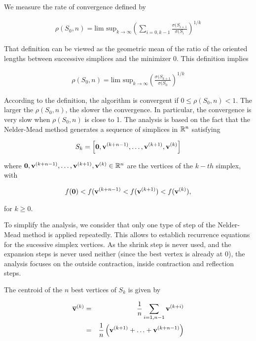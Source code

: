 We measure the rate of convergence defined by \cite{HanNeumann2006}

\begin{eqnarray}
\label{rho-rate-convergence}
\rho(S_0,n) = \textrm{lim sup}_{k\rightarrow \infty} 
\left(\sum_{i=0,k-1} \frac{\sigma(S_{i+1}}{\sigma(S_i}\right)^{1/k}
\end{eqnarray}

That definition can be viewed as the geometric mean of the ratio of the 
oriented lengths between successive simplices and the minimizer 0.
This definition implies 

\begin{eqnarray}
\label{rho-rate-convergence2}
\rho(S_0,n) = \textrm{lim sup}_{k\rightarrow \infty} 
\left( \frac{\sigma(S_{k+1}}{\sigma(S_0}\right)^{1/k}
\end{eqnarray}

According to the definition, the algorithm is convergent if $0\leq \rho(S_0,n) < 1$.
The larger the $\rho(S_0,n)$, the slower the convergence. In particular, the convergence 
is very slow when $\rho(S_0,n)$ is close to 1. 
The analysis is based on the fact that the Nelder-Mead method generates a sequence of simplices
in $\mathbb{R}^n$ satisfying 

\begin{eqnarray}
S_k = \left[\bold{0},\mathbf{v}^{(k+n-1)},\ldots,\mathbf{v}^{(k+1)},\mathbf{v}^{(k)}\right]
\end{eqnarray}

where $\bold{0},\mathbf{v}^{(k+n-1)},\ldots,\mathbf{v}^{(k+1)},\mathbf{v}^{(k)}\in\mathbb{R}^n$ are the vertices
of the $k-th$ simplex, with

\begin{eqnarray}
f(\bold{0}) < f(\mathbf{v}^{(k+n-1)} < f(\mathbf{v}^{(k+1)}) < f(\mathbf{v}^{(k)}),
\end{eqnarray}

for $k\geq 0$. 

To simplify the analysis, we consider that only one type of step of the Nelder-Mead 
method is applied repeatedly. This allows to establich recurrence equations for the 
sucessive simplex vertices. As the shrink step is never used, and the expansion steps is 
never used neither (since the best vertex is already at 0), the analysis focuses
on the outside contraction, inside contraction and reflection steps.

The centroid of the $n$ best vertices of $S_k$ is given by 

\begin{eqnarray}
\overline{\bold{v}}^{(k)} &=& \frac{1}{n} \sum_{i=1,n-1} \mathbf{v}^{(k+i)}\\
&=&\frac{1}{n} \left( \mathbf{v}^{(k+1)} + \ldots + \mathbf{v}^{(k+n-1)} \right)
\end{eqnarray}

